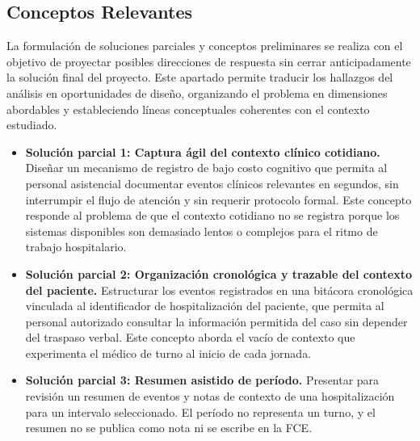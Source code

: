 
\subsection{Conceptos Relevantes}
La formulación de soluciones parciales y conceptos preliminares se realiza con el objetivo de proyectar posibles direcciones de respuesta sin cerrar anticipadamente la solución final del proyecto. Este apartado permite traducir los hallazgos del análisis en oportunidades de diseño, organizando el problema en dimensiones abordables y estableciendo líneas conceptuales coherentes con el contexto estudiado.

\begin{itemize}
    \item \textbf{Solución parcial 1: Captura ágil del contexto clínico cotidiano.} Diseñar un mecanismo de registro de bajo costo cognitivo que permita al personal asistencial documentar eventos clínicos relevantes en segundos, sin interrumpir el flujo de atención y sin requerir protocolo formal. Este concepto responde al problema de que el contexto cotidiano no se registra porque los sistemas disponibles son demasiado lentos o complejos para el ritmo de trabajo hospitalario.

    \item \textbf{Solución parcial 2: Organización cronológica y trazable del contexto del paciente.} Estructurar los eventos registrados en una bitácora cronológica vinculada al identificador de hospitalización del paciente, que permita al personal autorizado consultar la información permitida del caso sin depender del traspaso verbal. Este concepto aborda el vacío de contexto que experimenta el médico de turno al inicio de cada jornada.

    \item \textbf{Solución parcial 3: Resumen asistido de período.} Presentar para revisión un resumen de eventos y notas de contexto de una hospitalización para un intervalo seleccionado. El período no representa un turno, y el resumen no se publica como nota ni se escribe en la FCE.
\end{itemize}
